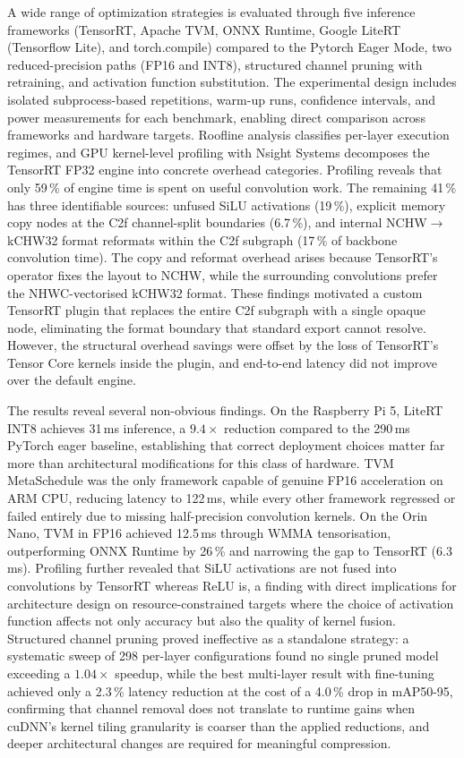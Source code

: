 \documentclass[12pt,a4paper]{report}
\begin{document}
A wide range of optimization strategies is evaluated through five inference frameworks (TensorRT, Apache TVM,
ONNX Runtime, Google LiteRT (Tensorflow Lite), and torch.compile) compared to the Pytorch Eager Mode,
two reduced-precision paths (FP16 and INT8),
structured channel pruning with retraining, and activation function substitution. The experimental design includes
isolated subprocess-based repetitions, warm-up runs, confidence intervals, and power measurements for each benchmark,
enabling direct comparison across frameworks and hardware targets. Roofline analysis classifies per-layer execution
regimes, and GPU kernel-level profiling with Nsight Systems
decomposes the TensorRT FP32 engine into concrete overhead categories.
Profiling reveals that only 59\,\% of engine time is spent on useful convolution work.
The remaining 41\,\% has three identifiable sources: unfused SiLU activations (19\,\%), explicit memory copy nodes
at the C2f channel-split boundaries (6.7\,\%), and internal NCHW$\to$kCHW32 format reformats within the C2f
subgraph (17\,\% of backbone convolution time).
The copy and reformat overhead arises because TensorRT's  operator fixes the layout to NCHW,
while the surrounding convolutions prefer the NHWC-vectorised kCHW32 format.
These findings motivated a custom TensorRT plugin that replaces the entire C2f subgraph with a single opaque node,
eliminating the format boundary that standard export cannot resolve.
However, the structural overhead savings were offset by the loss of TensorRT's Tensor Core kernels inside the plugin,
and end-to-end latency did not improve over the default engine.

The results reveal several non-obvious findings. On the Raspberry Pi 5, LiteRT INT8 achieves 31\,ms inference,
a $9.4\times$ reduction compared to the 290\,ms PyTorch eager baseline, establishing that correct deployment choices
matter far more than architectural modifications for this class of hardware. TVM MetaSchedule was the only framework
capable of genuine FP16 acceleration on ARM CPU, reducing latency to 122\,ms, while every other framework regressed
or failed entirely due to missing half-precision convolution kernels. On the Orin Nano, TVM in FP16 achieved 12.5\,ms
through WMMA tensorisation, outperforming ONNX Runtime by 26\,\% and narrowing the gap to TensorRT (6.3\,ms).
Profiling further revealed that SiLU activations are not fused into convolutions by TensorRT whereas ReLU is, a
finding with direct implications for architecture design on resource-constrained targets where the choice of activation
function affects not only accuracy but also the quality of kernel fusion. Structured channel pruning proved
ineffective as a standalone strategy: a systematic sweep of 298 per-layer configurations found no single pruned model
exceeding a $1.04\times$ speedup, while the best multi-layer result with fine-tuning achieved only a 2.3\,\%
latency reduction at the cost of a 4.0\,\% drop in mAP50-95, confirming that channel removal does not translate to
runtime gains when cuDNN's kernel
tiling granularity is coarser than the applied reductions, and deeper architectural changes
are required for meaningful compression.
\end{document}
